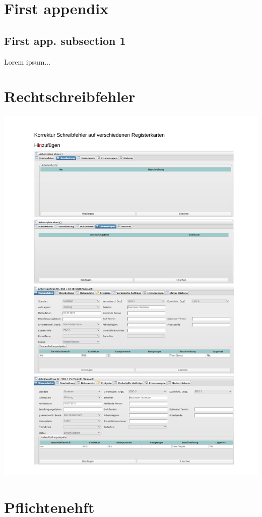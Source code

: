 \documentclass[12pt]{scrartcl}
\begin{document}
\clearpage
\begin{appendices}

	\section{First appendix}
		
		\subsection{First app. subsection 1}
		Lorem ipsum...

	\section{Rechtschreibfehler}
		\begin{center}
			\includegraphics[page=1, width=.85\textwidth]{pdf/test.pdf}		
		\end{center}
		
	\section{Pflichtenehft}
		


\end{appendices}

\clearpage
\listoffigures
\newpage

\listoftables
\newpage
\end{document}
